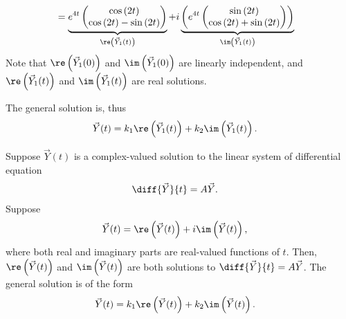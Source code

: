 \documentclass[10pt]{mypackage}
\begin{document}
\begin{example}
\begin{align*}
                            &= \underbrace{e^{4t} \begin{pmatrix}\cos\left(2t\right) \\ \cos\left(2t\right) - \sin\left(2t\right)\end{pmatrix}}_{\re\left(\vec{Y}_{1}(t)\right)} + i\underbrace{\left(e^{4t} \begin{pmatrix}\sin\left(2t\right)\\ \cos\left(2t\right) + \sin\left(2t\right)\end{pmatrix}\right)}_{\im\left(\vec{Y}_1(t)\right)}
  \end{align*}
  Note that $\re\left(\vec{Y}_1(0)\right)$ and $\im\left(\vec{Y}_1(0)\right)$ are linearly independent, and $\re\left(\vec{Y}_1(t)\right)$ and $\im\left(\vec{Y}_1(t)\right)$ are real solutions.\newline

  The general solution is, thus
  \begin{align*}
    \vec{Y}(t) &= k_1\re\left(\vec{Y}_1(t)\right) + k_2\im\left(\vec{Y}_1(t)\right).
  \end{align*}
\end{example}
\begin{theorem}
  Suppose $\vec{Y}(t)$ is a complex-valued solution to the linear system of differential equation
  \begin{align*}
    \diff{\vec{Y}}{t} &= A\vec{Y}.
  \end{align*}
  Suppose
  \begin{align*}
    \vec{Y}(t) &= \re\left(\vec{Y}(t)\right) + i\im\left(\vec{Y}(t)\right),
  \end{align*}
  where both real and imaginary parts are real-valued functions of $t$. Then, $\re\left(\vec{Y}(t)\right)$ and $\im\left(\vec{Y}(t)\right)$ are both solutions to $\diff{\vec{Y}}{t} = A\vec{Y}$. The general solution is of the form
  \begin{align*}
    \vec{Y}(t) &= k_1\re\left(\vec{Y}(t)\right) + k_2\im\left(\vec{Y}(t)\right).
  \end{align*}
\end{theorem}
\end{document}
